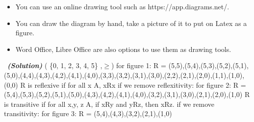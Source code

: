 \documentclass[a4 paper]{article}
\numberwithin{equation}{section}
\newcommand{\solution}{~\newline\textbf{\textit{(Solution)}} }
\newcommand{\0}{\mathbf{0}}
\begin{document}
\begin{itemize}
	\item You can use an online drawing tool such as https://app.diagrams.net/.
	\item You can draw the diagram by hand, take a picture of it to put on Latex as a figure.
	\item Word Office, Libre Office are also options to use them as drawing tools. 
\end{itemize}
\solution
\newline
( \{0,  1,  2,  3,  4,  5\} ,$\geq$)
\newline
\newline
for figure 1:
\newline
R = {(5,5),(5,4),(5,3),(5,2),(5,1),(5,0),(4,4),(4,3),(4,2),(4,1),(4,0),(3,3),(3,2),(3,1),(3,0),(2,2),(2,1),(2,0),(1,1),(1,0),(0,0)}
\newline
\newline
R is reflexive if for all x  A, xRx
if we remove reflexitivity:
\newline
\newline
for figure 2:
\newline
R = {(5,4),(5,3),(5,2),(5,1),(5,0),(4,3),(4,2),(4,1),(4,0),(3,2),(3,1),(3,0),(2,1),(2,0),(1,0)}
\newline
\newline
R is transitive if for all x,y, z  A, if xRy and yRz, then xRz.
if we remove transitivity:
\newline
\newline
for figure 3:
\newline
R = {(5,4),(4,3),(3,2),(2,1),(1,0)}
\end{document}
